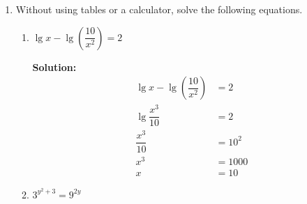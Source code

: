 \documentclass{report}
\newcommand{\sol}{\vspace{0.2cm}\textbf{Solution:}\vspace{0.2cm}}
\begin{document}
\begin{multicols*}{2}
\begin{enumerate}[leftmargin=*]
\begin{enumerate}
                        \sol{}
                        \begin{align*}
                            \sqrt{3x-5} - \sqrt{x+2}     & = \sqrt{x-6}                  \\
                            4x - 3 - 2\sqrt{(3x-5)(x+2)} & = x - 6                       \\
                            2\sqrt{3x^2+x-10}            & = 3x + 3                      \\
                            4(3x^2+x-10)                 & = 9x^2 + 18x + 9              \\
                            12x^2 + 4x - 40              & = 9x^2 + 18x + 9              \\
                            3x^2 - 14x - 49              & = 0                           \\
                            (3x + 7)(x - 7)              & = 0                           \\
                            x                            & = -\dfrac{7}{3} \text{ or } 7
                        \end{align*}
                        Upon checking, $x=7$ is the only valid solution.
              \end{enumerate}

        \item Without using tables or a calculator, solve the following equations.
              \begin{enumerate}[label=(\roman*)]
                  \item $\lg x-\lg \left(\dfrac{10}{x^2}\right)=2$

                        \sol{}
                        \begin{align*}
                            \lg x - \lg \left(\dfrac{10}{x^2}\right) & = 2    \\
                            \lg \dfrac{x^3}{10}                      & = 2    \\
                            \dfrac{x^3}{10}                          & = 10^2 \\
                            x^3                                      & = 1000 \\
                            x                                        & = 10
                        \end{align*}

                  \item  $3^{y^2+3}=9^{2 y}$


\end{enumerate}
\end{enumerate}
\end{multicols*}
\end{document}
